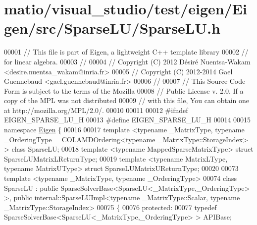 \hypertarget{matio_2visual__studio_2test_2eigen_2_eigen_2src_2_sparse_l_u_2_sparse_l_u_8h_source}{}\section{matio/visual\+\_\+studio/test/eigen/\+Eigen/src/\+Sparse\+L\+U/\+Sparse\+LU.h}
\label{matio_2visual__studio_2test_2eigen_2_eigen_2src_2_sparse_l_u_2_sparse_l_u_8h_source}

\begin{DoxyCode}
00001 \textcolor{comment}{// This file is part of Eigen, a lightweight C++ template library}
00002 \textcolor{comment}{// for linear algebra.}
00003 \textcolor{comment}{//}
00004 \textcolor{comment}{// Copyright (C) 2012 Désiré Nuentsa-Wakam <desire.nuentsa\_wakam@inria.fr>}
00005 \textcolor{comment}{// Copyright (C) 2012-2014 Gael Guennebaud <gael.guennebaud@inria.fr>}
00006 \textcolor{comment}{//}
00007 \textcolor{comment}{// This Source Code Form is subject to the terms of the Mozilla}
00008 \textcolor{comment}{// Public License v. 2.0. If a copy of the MPL was not distributed}
00009 \textcolor{comment}{// with this file, You can obtain one at http://mozilla.org/MPL/2.0/.}
00010 
00011 
00012 \textcolor{preprocessor}{#ifndef EIGEN\_SPARSE\_LU\_H}
00013 \textcolor{preprocessor}{#define EIGEN\_SPARSE\_LU\_H}
00014 
00015 \textcolor{keyword}{namespace }\hyperlink{namespace_eigen}{Eigen} \{
00016 
00017 \textcolor{keyword}{template} <\textcolor{keyword}{typename} \_MatrixType, \textcolor{keyword}{typename} \_OrderingType = COLAMDOrdering<\textcolor{keyword}{typename} \_MatrixType::StorageIndex>
       > \textcolor{keyword}{class }SparseLU;
00018 \textcolor{keyword}{template} <\textcolor{keyword}{typename} MappedSparseMatrixType> \textcolor{keyword}{struct }SparseLUMatrixLReturnType;
00019 \textcolor{keyword}{template} <\textcolor{keyword}{typename} MatrixLType, \textcolor{keyword}{typename} MatrixUType> \textcolor{keyword}{struct }SparseLUMatrixUReturnType;
00020 
00073 \textcolor{keyword}{template} <\textcolor{keyword}{typename} \_MatrixType, \textcolor{keyword}{typename} \_OrderingType>
00074 \textcolor{keyword}{class }SparseLU : \textcolor{keyword}{public} SparseSolverBase<SparseLU<\_MatrixType,\_OrderingType> >, \textcolor{keyword}{public} 
      internal::SparseLUImpl<typename \_MatrixType::Scalar, typename \_MatrixType::StorageIndex>
00075 \{
00076   \textcolor{keyword}{protected}:
00077     \textcolor{keyword}{typedef} SparseSolverBase<SparseLU<\_MatrixType,\_OrderingType> > APIBase;

\end{DoxyCode}
